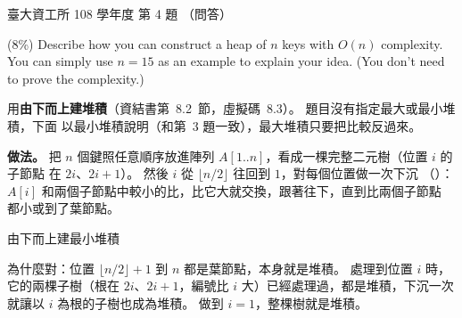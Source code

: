 \begin{pastexam}[label={px:ntu-108-dsaa-04}]{臺大資工所 108 學年度 第 4 題}
（問答）

(8\%) Describe how you can construct a heap of $n$ keys with $O(n)$ complexity. You can simply
use $n=15$ as an example to explain your idea. (You don't need to prove the complexity.)
\end{pastexam}

\begin{pastsoln}
用\textbf{由下而上建堆積}（資結書第~8.2~節，虛擬碼~8.3）。 題目沒有指定最大或最小堆積，下面
以最小堆積說明（和第~3 題一致），最大堆積只要把比較反過來。

\textbf{做法。} 把 $n$ 個鍵照任意順序放進陣列 $A[1..n]$，看成一棵完整二元樹（位置 $i$ 的子節點
在 $2i$、$2i + 1$）。 然後 $i$ 從 $\lfloor n/2 \rfloor$ 往回到 $1$，對每個位置做一次下沉
（）：$A[i]$ 和兩個子節點中較小的比，比它大就交換，跟著往下，直到比兩個子節點
都小或到了葉節點。
\begin{pseudo}{由下而上建最小堆積}
        \State {} 
    \EndFor
\EndProcedure
\end{pseudo}
為什麼對：位置 $\lfloor n/2 \rfloor + 1$ 到 $n$ 都是葉節點，本身就是堆積。 處理到位置 $i$ 時，
它的兩棵子樹（根在 $2i$、$2i + 1$，編號比 $i$ 大）已經處理過，都是堆積，下沉一次就讓以 $i$
為根的子樹也成為堆積。 做到 $i = 1$，整棵樹就是堆積。


\end{pastsoln}
